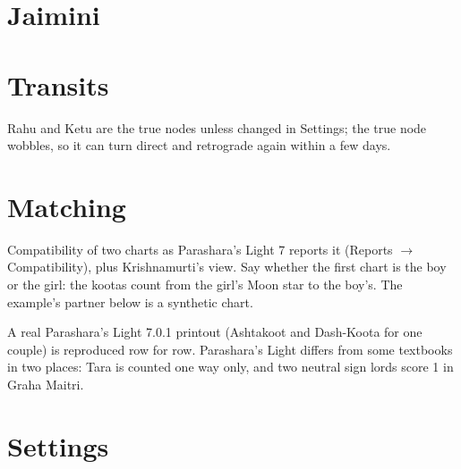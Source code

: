 \documentclass[11pt, a4paper]{article}
\newcommand{\shot}[1]{}
\newcommand{\PL}{Parashara's Light}
\begin{document}
\section{Jaimini}
\label{sec:jaimini}
\shot{jakarakas}
\shot{jalagnas}
\shot{jaarudha}
\shot{jakm}
\shot{jaargala}
\shot{jadrishti}

\section{Transits}
\label{sec:transits}
\shot{trcontrols}
\shot{trpos}
\shot{trevents}

Rahu and Ketu are the true nodes unless changed in Settings; the true node wobbles, so it can turn direct
and retrograde again within a few days.

\shot{trsade}
\shot{trreturns}

\section{Matching}
\label{sec:matching}
Compatibility of two charts as \PL{} 7 reports it (Reports $\rightarrow$ Compatibility), plus Krishnamurti's
view. Say whether the first chart is the boy or the girl: the kootas count from the girl's Moon star to the
boy's. The example's partner below is a synthetic chart.

\shot{mentry}
\shot{mover}
\shot{mashta}
\shot{mmangal}
\shot{mdk}
\shot{mkp}

\begin{notebox}A real \PL{} 7.0.1 printout (Ashtakoot and Dash-Koota for one couple) is reproduced row for
row. \PL{} differs from some textbooks in two places: Tara is counted one way only, and two neutral sign
lords score 1 in Graha Maitri.\end{notebox}

\section{Settings}
\label{sec:settings}
\shot{secalc}
\end{document}
